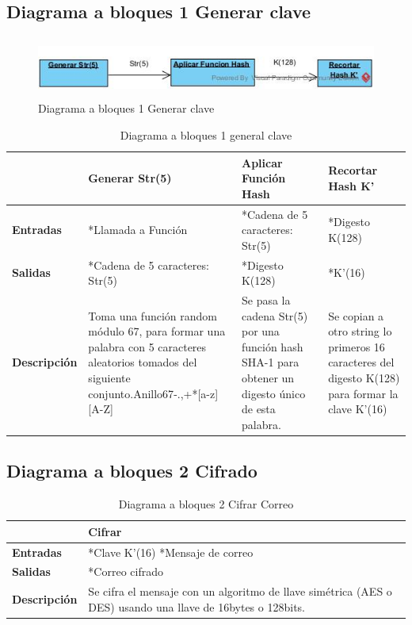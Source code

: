 \newpage
\newpage
\subsection{Diagrama a bloques 1 Generar clave}
\begin{figure}[H]
	\includegraphics[width=1\linewidth, height=2cm]{./images/bloques1.jpg}
	\caption{Diagrama a bloques 1 Generar clave}
	\label{fig:5-2-1}
\end{figure}
\begin{table}[H]
 \centering
   {
     \begin{tabular}{| p{4cm} | p{4cm} | p{4cm} | p{4cm} |}
     \hline
     & \textbf{Generar Str(5)} & \textbf{Aplicar Función Hash} & \textbf{Recortar Hash K’}\\
     \hline
     \textbf{Entradas} & *Llamada a Función & *Cadena de 5 caracteres: Str(5) & *Digesto K(128)\\
     \hline
     \textbf{Salidas} & *Cadena de 5 caracteres: Str(5) & *Digesto K(128) & *K’(16)\\
     \hline
     \textbf{Descripción} & Toma una función random módulo 67, para formar una palabra con 5 caracteres aleatorios tomados del siguiente conjunto.Anillo67{-.,+*[a-z][A-Z]} & Se pasa la cadena Str(5) por una función hash SHA-1 para obtener un digesto único de esta palabra. & Se copian a otro string lo primeros 16 caracteres del digesto K(128) para formar la clave K’(16)\\
	\hline
    \end{tabular}
    }
    \caption{Diagrama a bloques 1 general clave}
    \label{tabla:b1}
\end{table}
\subsection{Diagrama a bloques 2 Cifrado}
\begin{table}[H]
 \centering
   {
     \begin{tabular}{| p{3cm} | p{3cm} |}
     \hline
     & \textbf{Cifrar}\\
     \hline
     \textbf{Entradas} & *Clave K’(16) *Mensaje de correo\\
     \hline
     \textbf{Salidas} & *Correo cifrado\\
     \hline
     \textbf{Descripción} & Se cifra el mensaje con un algoritmo de llave simétrica (AES o DES) usando una llave de 16bytes o 128bits.\\
	\hline
    \end{tabular}
    }
    \caption{Diagrama a bloques 2 Cifrar Correo}
    \label{tabla:b2}
\end{table}
